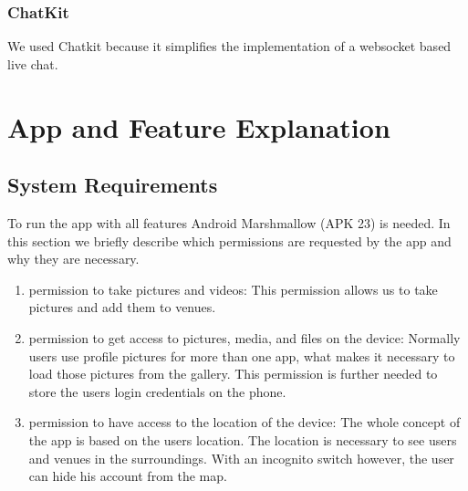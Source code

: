\documentclass[11pt, accentcolor=tud1c]{tudreport}
\begin{document}
\subsection{ChatKit}
We used Chatkit\cite{chatkit} because it simplifies the implementation of a websocket based live chat.



\chapter{App and Feature Explanation}\label{ch:app_and_feature_explanation}

\section{System Requirements}\label{sec:system_requirements}
To run the app with all features Android Marshmallow (APK 23) is needed. 
In this section we briefly describe which permissions are requested by the app and why they are necessary.
\begin{enumerate}
\item permission to take pictures and videos: This permission allows us to take pictures and add them to venues.
\item permission to get access to pictures, media, and files on the device: Normally users use profile pictures for more than one app, what makes it necessary to load those pictures from the gallery. This permission is further needed to store the users login credentials on the phone.
\item permission to have access to the location of the device: The whole concept of the app is based on the users location. The location is necessary to see users and venues in the surroundings. With an incognito switch however, the user can hide his account from the map.
\end{enumerate}
\end{document}
